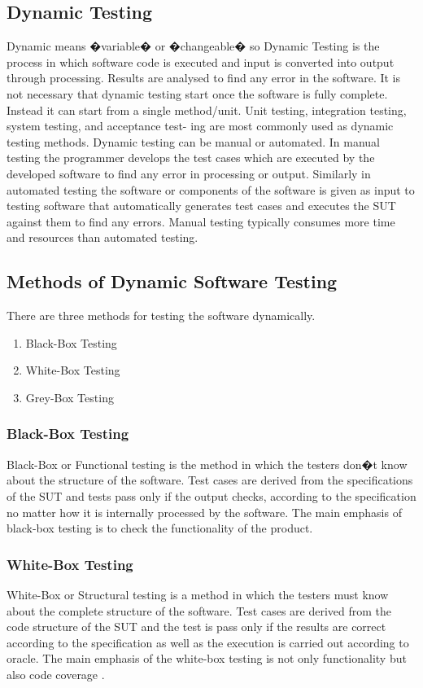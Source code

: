 \subsection{Dynamic Testing}

Dynamic means �variable� or �changeable� so Dynamic Testing is the process in which software code is executed and input is converted into output through processing. Results are analysed to find any error in the software. It is not necessary that dynamic testing start once the software is fully complete. Instead it can start from a single method/unit. Unit testing, integration testing, system testing, and acceptance test- ing are most commonly used as dynamic testing methods. Dynamic testing can be manual or automated. In manual testing the programmer develops the test cases which are executed by the developed software to find any error in processing or output. Similarly in automated testing the software or components of the software is given as input to testing software that automatically generates test cases and executes the SUT against them to find any errors. Manual testing typically consumes more time and resources than automated testing.


\subsection{Methods of Dynamic Software Testing}
There are three methods for testing the software dynamically.

\begin{enumerate}
\item Black-Box Testing
\item White-Box Testing
\item Grey-Box Testing
\end{enumerate}

\subsubsection{Black-Box Testing}
Black-Box or Functional testing is the method in which the testers don�t know about the structure of the software. Test cases are derived from the specifications of the SUT and tests pass only if the output checks, according to the specification no matter how it is internally processed by the software. The main emphasis of black-box testing is to check the functionality of the product.

\subsubsection{White-Box Testing}
White-Box or Structural testing is a method in which the testers must know about the complete structure of the software. Test cases are derived from the code structure of the SUT and the test is pass only if the results are correct according to the specification as well as the execution is carried out according to oracle. The main emphasis of the white-box testing is not only functionality but also code coverage \cite{Agarwal2009}.

